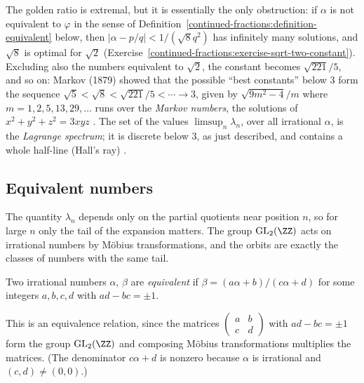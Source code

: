 \begin{remark}\label{continued-fractions:remark-markov}
The golden ratio is extremal, but it is essentially the only obstruction: if $\alpha$ is not equivalent to $\varphi$ in the sense of Definition~\ref{continued-fractions:definition-equivalent}
below, then $|\alpha - p/q| < 1/(\sqrt8q^2)$ has infinitely many solutions, and $\sqrt8$ is optimal for $\sqrt2$ (Exercise~\ref{continued-fractions:exercise-sqrt-two-constant}). Excluding also the
numbers equivalent to $\sqrt2$, the constant becomes $\sqrt{221}/5$, and so on: Markov (1879) showed that the possible ``best constants'' below $3$ form the sequence
$\sqrt5 < \sqrt8 < \sqrt{221}/5 < \cdots \to 3$, given by $\sqrt{9m^2 - 4}/m$ where $m = 1, 2, 5, 13, 29, \ldots$ runs over the \emph{Markov numbers}, the solutions of $x^2 + y^2 + z^2 = 3xyz$
\cite{cusick-flahive}. The set of the values $\limsup_n\lambda_n$, over all irrational $\alpha$, is the \emph{Lagrange spectrum}; it is discrete below $3$, as just described, and contains a
whole half-line (Hall's ray) \cite{cusick-flahive}.
\end{remark}

\subsection{Equivalent numbers}\label{continued-fractions:subsection-equivalent}

The quantity $\lambda_n$ depends only on the partial quotients near position $n$, so for large $n$ only the tail of the expansion matters. The group $\mathrm{GL}_2(\ZZ)$ acts on irrational numbers by
Möbius transformations, and the orbits are exactly the classes of numbers with the same tail.

\begin{definition}\label{continued-fractions:definition-equivalent}
Two irrational numbers $\alpha$, $\beta$ are \emph{equivalent} if $\beta = (a\alpha + b)/(c\alpha + d)$ for some integers $a, b, c, d$ with $ad - bc = \pm 1$.
\end{definition}

This is an equivalence relation, since the matrices $\begin{pmatrix} a & b\\ c & d\end{pmatrix}$ with $ad - bc = \pm 1$ form the group $\mathrm{GL}_2(\ZZ)$ and composing Möbius transformations
multiplies the matrices. (The denominator $c\alpha + d$ is nonzero because $\alpha$ is irrational and $(c, d) \neq (0, 0)$.)

